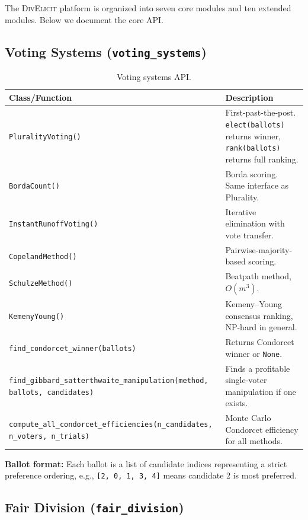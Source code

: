 \documentclass[10pt]{article}
\begin{document}
The \textsc{DivElicit} platform is organized into seven core modules and ten extended modules. Below we document the core API.

\subsection{Voting Systems (\texttt{voting\_systems})}

\begin{table}[H]
\centering
\caption{Voting systems API.}
\label{tab:api-voting}
\begin{tabularx}{\textwidth}{lX}
\toprule
\textbf{Class/Function} & \textbf{Description} \\
\midrule
\texttt{PluralityVoting()} & First-past-the-post. \texttt{elect(ballots)} returns winner, \texttt{rank(ballots)} returns full ranking. \\
\texttt{BordaCount()} & Borda scoring. Same interface as Plurality. \\
\texttt{InstantRunoffVoting()} & Iterative elimination with vote transfer. \\
\texttt{CopelandMethod()} & Pairwise-majority-based scoring. \\
\texttt{SchulzeMethod()} & Beatpath method, $O(m^3)$. \\
\texttt{KemenyYoung()} & Kemeny--Young consensus ranking, NP-hard in general. \\
\texttt{find\_condorcet\_winner(ballots)} & Returns Condorcet winner or \texttt{None}. \\
\texttt{find\_gibbard\_satterthwaite\_manipulation(method, ballots, candidates)} & Finds a profitable single-voter manipulation if one exists. \\
\texttt{compute\_all\_condorcet\_efficiencies(n\_candidates, n\_voters, n\_trials)} & Monte Carlo Condorcet efficiency for all methods. \\
\bottomrule
\end{tabularx}
\end{table}

\textbf{Ballot format:} Each ballot is a list of candidate indices representing a strict preference ordering, e.g., \texttt{[2, 0, 1, 3, 4]} means candidate 2 is most preferred.

\subsection{Fair Division (\texttt{fair\_division})}
\end{document}

